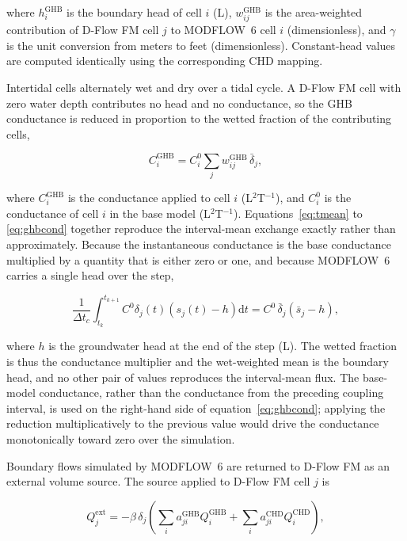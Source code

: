 \documentclass[preprint,authoryear,11pt]{elsarticle}
\begin{document}
\noindent where $h_{i}^{\mathrm{GHB}}$ is the boundary head of cell $i$ (L), $w_{ij}^{\mathrm{GHB}}$ is the area-weighted contribution of D-Flow FM cell $j$ to MODFLOW~6 cell $i$ (dimensionless), and $\gamma$ is the unit conversion from meters to feet (dimensionless). Constant-head values are computed identically using the corresponding CHD mapping.

Intertidal cells alternately wet and dry over a tidal cycle. A D-Flow FM cell with zero water depth contributes no head and no conductance, so the GHB conductance is reduced in proportion to the wetted fraction of the contributing cells,

\begin{equation}
  C_{i}^{\mathrm{GHB}} = C_{i}^{0} \sum_{j} w_{ij}^{\mathrm{GHB}} \,
      \bar{\delta}_{j} ,
  \label{eq:ghbcond}
\end{equation}

\noindent where $C_{i}^{\mathrm{GHB}}$ is the conductance applied to cell $i$ (L$^{2}$T$^{-1}$), and $C_{i}^{0}$ is the conductance of cell $i$ in the base model (L$^{2}$T$^{-1}$). Equations~\ref{eq:tmean} to \ref{eq:ghbcond} together reproduce the interval-mean exchange exactly rather than approximately. Because the instantaneous conductance is the base conductance multiplied by a quantity that is either zero or one, and because MODFLOW~6 carries a single head over the step,

\begin{equation}
  \frac{1}{\Delta t_{c}} \int_{t_{k}}^{t_{k+1}} C^{0} \delta_{j}(t)
      \left( s_{j}(t) - h \right) \mathrm{d}t
    = C^{0} \, \bar{\delta}_{j} \left( \bar{s}_{j} - h \right) ,
  \label{eq:exact}
\end{equation}

\noindent where $h$ is the groundwater head at the end of the step (L). The wetted fraction is thus the conductance multiplier and the wet-weighted mean is the boundary head, and no other pair of values reproduces the interval-mean flux. The base-model conductance, rather than the conductance from the preceding coupling interval, is used on the right-hand side of equation~\ref{eq:ghbcond}; applying the reduction multiplicatively to the previous value would drive the conductance monotonically toward zero over the simulation.

Boundary flows simulated by MODFLOW~6 are returned to D-Flow FM as an external volume source. The source applied to D-Flow FM cell $j$ is

\begin{equation}
  Q_{j}^{\mathrm{ext}} = -\beta \, \delta_{j}
    \left( \sum_{i} a_{ji}^{\mathrm{GHB}} Q_{i}^{\mathrm{GHB}}
         + \sum_{i} a_{ji}^{\mathrm{CHD}} Q_{i}^{\mathrm{CHD}} \right) ,
  \label{eq:qext}
\end{equation}
\end{document}
